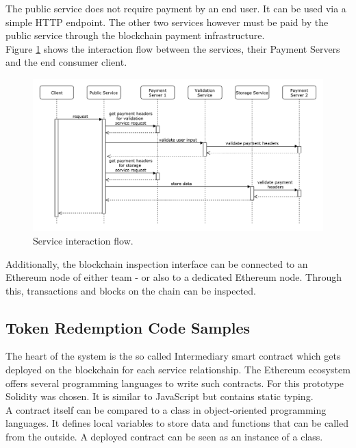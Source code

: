 \documentclass[a4paper,12pt]{scrartcl}
\begin{document}
The public service does not require payment by an end user. It can be used via a simple HTTP endpoint. The other two services however must be paid by the public service through the blockchain payment infrastructure.\\
Figure \ref{fig:ServiceInteractionFlow} shows the interaction flow between the services, their Payment Servers and the end consumer client.\\

\begin{figure}[H]
\centering
\includegraphics[width=450pt]{Images/ServiceInteractionFlow.pdf}
\caption{Service interaction flow.}
\label{fig:ServiceInteractionFlow}
\end{figure}

Additionally, the blockchain inspection interface can be connected to an Ethereum node of either team - or also to a dedicated Ethereum node. Through this, transactions and blocks on the chain can be inspected.

\subsection{Token Redemption Code Samples}

The heart of the system is the so called Intermediary smart contract which gets deployed on the blockchain for each service relationship. The Ethereum ecosystem offers several programming languages to write such contracts. For this prototype Solidity \cite{web52} was chosen. It is similar to JavaScript but contains static typing.\\
A contract itself can be compared to a class in object-oriented programming languages. It defines local variables to store data and functions that can be called from the outside. A deployed contract can be seen as an instance of a class.\\
\end{document}
